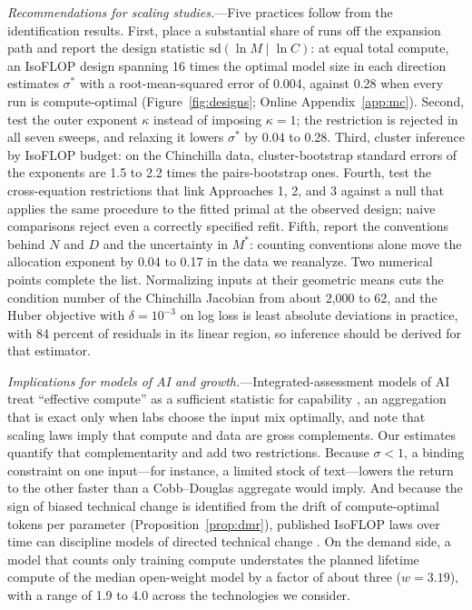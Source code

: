 \emph{Recommendations for scaling studies.}---Five practices follow from the identification results. First,
place a substantial share of runs off the expansion path and report the design statistic
$\mathrm{sd}(\ln M\mid\ln C)$: at equal total compute, an IsoFLOP design spanning 16 times the optimal model
size in each direction estimates $\sigma^*$ with a root-mean-squared error of 0.004, against 0.28 when every run
is compute-optimal (Figure~\ref{fig:designs}; Online Appendix~\ref{app:mc}). Second, test the outer exponent
$\kappa$ instead of imposing $\kappa=1$; the restriction is rejected in all seven sweeps, and relaxing it lowers
$\sigma^*$ by 0.04 to 0.28. Third, cluster inference by IsoFLOP budget: on the Chinchilla data, cluster-bootstrap standard errors
of the exponents are 1.5 to 2.2 times the pairs-bootstrap ones. Fourth, test the cross-equation restrictions
that link Approaches 1, 2, and 3 against a null that applies the same procedure to the fitted primal at the
observed design; naive comparisons reject even a correctly specified refit. Fifth, report the conventions behind
$N$ and $D$ and the uncertainty in $M^*$: counting conventions alone move the allocation exponent by 0.04 to
0.17 in the data we reanalyze. Two numerical points complete the list. Normalizing inputs at their geometric
means cuts the condition number of the Chinchilla Jacobian from about 2,000 to 62, and the Huber objective with
$\delta=10^{-3}$ on log loss is least absolute deviations in practice, with 84 percent of residuals in its
linear region, so inference should be derived for that estimator.

\emph{Implications for models of AI and growth.}---Integrated-assessment models of AI treat ``effective
compute'' as a sufficient statistic for capability \citep{erdil2025gate}, an aggregation that is exact only when
labs choose the input mix optimally, and \citet{trammell2023economic} note that scaling laws imply that compute and data are
gross complements. Our estimates quantify that complementarity and add two restrictions. Because $\sigma<1$, a
binding constraint on one input---for instance, a limited stock of text---lowers the return to the other faster
than a Cobb--Douglas aggregate would imply. And because the sign of biased
technical change is identified from the drift of compute-optimal tokens per parameter
(Proposition~\ref{prop:dmr}), published IsoFLOP laws over time can discipline models of directed technical
change \citep{acemoglu2002directed}. On the demand side, a model that counts only training compute understates
the planned lifetime compute of the median open-weight model by a factor of about three ($w=3.19$), with a range
of 1.9 to 4.0 across the technologies we consider.

